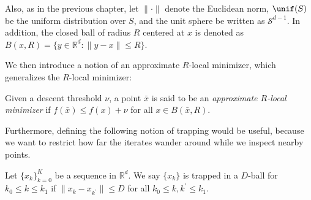 Also, as in the previous chapter, let $\| \cdot \|$ denote the Euclidean norm, $\unif(S)$ be the uniform distribution over $S$, and the unit sphere be written as $\mathcal{S}^{d-1}$. In addition, the closed ball of radius $R$ centered at $x$ is denoted as $B(x, R) = \{y \in \mathbb{R}^d : \|y - x\| \leq R\}$.

We then introduce a notion of an approximate $R$-local minimizer, which generalizes the $R$-local minimizer:
\begin{definition} \label{def: approximate R-local minimizer}
    Given a descent threshold $\nu$, a point $\bar{x}$ is said to be an \emph{approximate $R$-local minimizer} if $f(\bar{x}) \leq f(x) + \nu$ for all $x \in B(\bar{x}, R)$.    
\end{definition}

Furthermore, defining the following notion of trapping would be useful, because we want to restrict how far the iterates wander around while we inspect nearby points.
\begin{definition}
    Let $\{x_k\}_{k=0}^{K}$ be a sequence in $\mathbb{R}^d$. We say $\{x_k\}$ is trapped in a $D$-ball for $k_0 \leq k \leq k_1$ if $\|x_{k} - x_{k^{\prime}}\| \leq D$ for all $k_0 \leq k, k^{\prime} \leq k_1$.
\end{definition}

